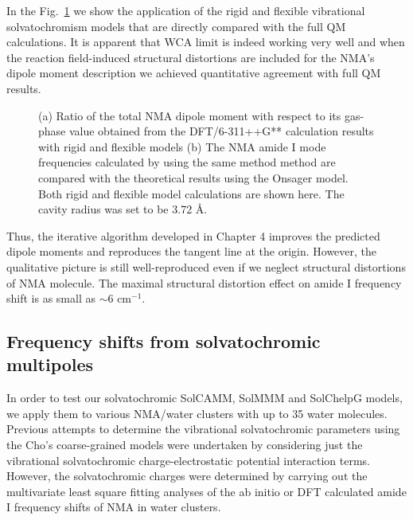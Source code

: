 \documentclass[a4paper,titlepage,twoside,fleqn,12pt]{book}
\begin{document}
\begin{refsection}
In the Fig.~\ref{f:onsager} we show the application of the rigid
and flexible vibrational solvatochromism models that are directly
compared with the full QM calculations. It is apparent that WCA
limit is indeed working very well and when the reaction field\hyp{}induced 
structural distortions
are included for the NMA's dipole moment description 
we achieved quantitative agreement
with full QM results. 
%
\begin{figure}[t!]
\centering
\setlength\fboxsep{0.4pt}
\setlength\fboxrule{0.5pt}
\caption{
(a) Ratio of the total NMA dipole moment with respect to its gas\hyp{}phase
value obtained from the DFT/6-311++G** calculation results with rigid and flexible
models (b) The NMA amide I mode frequencies calculated by using the same method
method are compared with the theoretical results using the Onsager model. 
Both rigid and flexible model calculations are shown here. The cavity radius was set
to be 3.72 \AA.
\label{f:onsager}}
\end{figure}
%
Thus, the
iterative algorithm developed in Chapter 4 improves the predicted
dipole moments and reproduces the tangent line at the origin.
However, the qualitative
picture is still well\hyp{}reproduced even if we neglect
structural distortions of NMA molecule. The maximal structural
distortion effect on amide I frequency shift is as small
as $\sim$6 cm$^{-1}$.

\subsection{Frequency shifts from solvatochromic multipoles}

In order to test our solvatochromic SolCAMM, SolMMM and SolChelpG models,
we apply them to various NMA/water clusters
with up to 35 water molecules. Previous attempts\citep{Lee.Choi.Cho.JCP.2012}
to determine the vibrational solvatochromic parameters using the Cho's
coarse\hyp{}grained models were undertaken by considering just the 
vibrational solvatochromic charge\hyp{}electrostatic potential
interaction terms. However, the solvatochromic charges
were determined by carrying out the multivariate
least square fitting analyses of the ab initio or DFT calculated
amide I frequency shifts of NMA in water clusters. 


\end{refsection}
\end{document}
